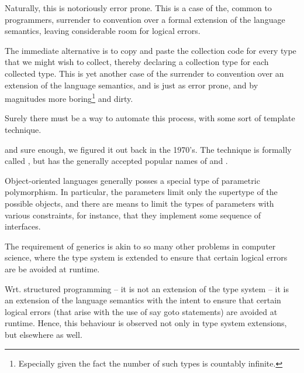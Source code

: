 Naturally, this is notoriously error prone. This is a case of the, common to
programmers, surrender to convention over a formal extension of the language
semantics, leaving considerable room for logical errors.

The immediate alternative is to copy and paste the collection code for every
type that we might wish to collect, thereby declaring a collection type for
each collected type. This is yet another case of the surrender to convention
over an extension of the language semantics, and is just as error prone, and by
magnitudes more boring\footnote{Especially given the fact the number of such
types is countably infinite.} and dirty.

Surely there must be a way to automate this process, with some sort of template technique.

 and sure
enough, we figured it out back in the
1970's\cite{the-c++-programming-language}. The technique is formally called
, but has the generally accepted popular names of
 and .

Object-oriented languages generally posses a special type of parametric
polymorphism. In particular, the parameters limit only the supertype of the
possible objects, and there are means to limit the types of parameters with
various constraints, for instance, that they implement some sequence of
interfaces.

\newpage


The requirement of generics is akin to so many other problems in computer
science, where the type system is extended to ensure that certain logical
errors are be avoided at runtime.

Wrt. structured programming -- it is not an extension of the type system -- it
is an extension of the language semantics with the intent to ensure that
certain logical errors (that arise with the use of say goto statements) are
avoided at runtime. Hence, this behaviour is observed not only in type system
extensions, but elsewhere as well.
